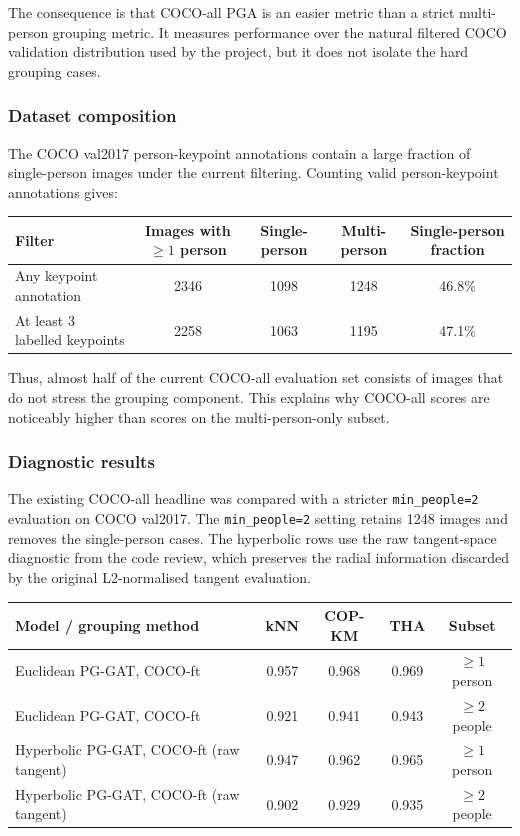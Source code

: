 The consequence is that COCO-all PGA is an easier metric than a strict multi-person grouping metric.
It measures performance over the natural filtered COCO validation distribution used by the project, but it does not isolate the hard grouping cases.

\subsubsection{Dataset composition}

The COCO val2017 person-keypoint annotations contain a large fraction of single-person images under the current filtering.
Counting valid person-keypoint annotations gives:

\begin{tabular}{lcccc}
\hline
\textbf{Filter} & \textbf{Images with $\geq 1$ person} & \textbf{Single-person} & \textbf{Multi-person} & \textbf{Single-person fraction} \\
\hline
Any keypoint annotation & 2346 & 1098 & 1248 & 46.8\% \\
At least 3 labelled keypoints & 2258 & 1063 & 1195 & 47.1\% \\
\hline
\end{tabular}

\vspace{0.5em}

Thus, almost half of the current COCO-all evaluation set consists of images that do not stress the grouping component.
This explains why COCO-all scores are noticeably higher than scores on the multi-person-only subset.

\subsubsection{Diagnostic results}

The existing COCO-all headline was compared with a stricter \texttt{min\_people=2} evaluation on COCO val2017.
The \texttt{min\_people=2} setting retains 1248 images and removes the single-person cases.
The hyperbolic rows use the raw tangent-space diagnostic from the code review, which preserves the radial information discarded by the original L2-normalised tangent evaluation.

\begin{tabular}{lcccc}
\hline
\textbf{Model / grouping method} & \textbf{kNN} & \textbf{COP-KM} & \textbf{THA} & \textbf{Subset} \\
\hline
Euclidean PG-GAT, COCO-ft & 0.957 & 0.968 & 0.969 & $\geq 1$ person \\
Euclidean PG-GAT, COCO-ft & 0.921 & 0.941 & 0.943 & $\geq 2$ people \\
\hline
Hyperbolic PG-GAT, COCO-ft (raw tangent) & 0.947 & 0.962 & 0.965 & $\geq 1$ person \\
Hyperbolic PG-GAT, COCO-ft (raw tangent) & 0.902 & 0.929 & 0.935 & $\geq 2$ people \\
\hline
\end{tabular}

